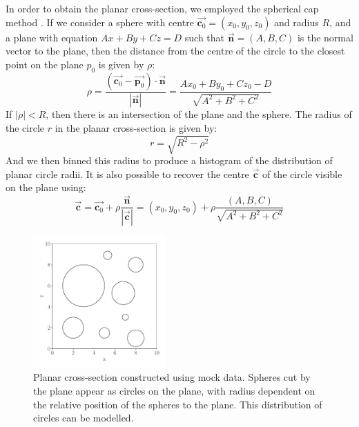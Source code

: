 \documentclass[journal]{IEEEtran}
\begin{document}
In order to obtain the planar cross-section, we employed the spherical cap
method \cite{Sykes1922}. If we consider a sphere with centre
$\overrightarrow{\textbf{c}_0} = (x_0, y_0, z_0)$ and radius $R$, and a plane
with equation $Ax + By + Cz = D$ such that $\overrightarrow{\textbf{n}} = (A, B,
C)$ is the normal vector to the plane, then the distance from the centre of the
circle to the closest point on the plane $p_0$ is given by $\rho$:
\begin{equation*}
\rho = \frac{(\overrightarrow{\textbf{c}_0} - \overrightarrow{\textbf{p}_0}) \cdot{}
  \overrightarrow{\textbf{n}}}{|\overrightarrow{\textbf{n}}|} = \frac{Ax_0 +
  By_0 + Cz_0 - D}{\sqrt{A^2 + B^2 + C^2}}
\end{equation*}
If $|\rho| < R$, then there is an intersection of the plane and the sphere. The
radius of the circle $r$ in the planar cross-section is given by:
\begin{equation*}
r = \sqrt{R^2 - \rho^2}
\end{equation*}
And we then binned this radius to produce a histogram of the distribution of
planar circle radii. It is also possible to recover the centre
$\overrightarrow{\textbf{c}}$ of the circle visible on the plane using:
\begin{equation*}
\overrightarrow{\textbf{c}} = \overrightarrow{\textbf{c}_0} +
\rho\frac{\overrightarrow{\textbf{n}}}{|\overrightarrow{\textbf{c}}|} = (x_0,
y_0, z_0) + \rho\frac{(A, B, C)}{\sqrt{A^2 + B^2 + C^2}}
\end{equation*}

\begin{figure}%
\begin{center}
\includegraphics[width=0.45\textwidth]{./../Figures/circles.pdf}
\caption{Planar cross-section constructed using mock data. Spheres cut by the
  plane appear as circles on the plane, with radius dependent on the relative
  position of the spheres to the plane. This distribution of circles can be
  modelled.}\label{fig:circles}
\end{center}
\end{figure}
\end{document}
